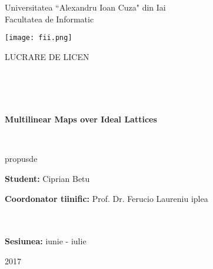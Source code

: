 \begin{titlepage}
	
	\begin{center}
		\begin{large}
			Universitatea ``Alexandru Ioan Cuza" din Ia\sh i\\
			Facultatea de Informatic\ua\\
		\end{large}
	\end{center}
	
	\vspace{40mm}
	
	\begin{center}
		\texttt{[image: fii.png]}
	\end{center}
	
	\vspace{15mm}
	
	\begin{center}
		\begin{Large}
			LUCRARE DE LICEN\Tz \uA
		\end{Large}
		\\
		\
		\\
		\
		\
		
		\begin{Huge}
			\textbf{Multilinear Maps over Ideal Lattices}
		\end{Huge}
		
		\
		
		propus\ua \space de
		
	\end{center}
	
	\vspace{40mm}
	
	\textbf{Student:} Ciprian B\ua etu
	
	\textbf{Coordonator \sh tiin\tz ific:} Prof. Dr. Ferucio Lauren\tz iu \Tz iplea
	\\
	\
	\\
	\
	
	
	\vfill
	
	\begin{center}
		\textbf{Sesiunea:} iunie - iulie
		
		2017
	\end{center}
	
\end{titlepage}
\newpage

